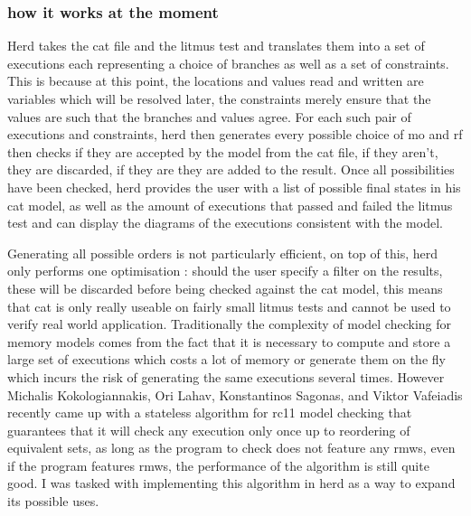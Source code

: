 \documentclass[a4,12pt]{article}
\begin{document}
\subsubsection{how it works at the moment}

Herd takes the cat file and the litmus test and translates them into a set of executions each representing a choice of branches as well as a set of constraints. This is because at this point, the locations and values read and written are variables which will be resolved later, the constraints merely ensure that the values are such that the branches and values agree. For each such pair of executions and constraints, herd then generates every possible choice of mo and rf then checks if they are accepted by the model from the cat file, if they aren't, they are discarded, if they are they are added to the result. Once all possibilities have been checked, herd provides the user with a list of possible final states in his cat model, as well as the amount of executions that passed and failed the litmus test and can display the diagrams of the executions consistent with the model.


Generating all possible orders is not particularly efficient, on top of this, herd only performs one optimisation : should the user specify a filter on the results, these will be discarded before being checked against the cat model, this means that cat is only really useable on fairly small litmus tests and cannot be used to verify real world application. Traditionally the complexity of model checking for memory models comes from the fact that it is necessary to compute and store a large set of executions which costs a lot of memory or generate them on the fly which incurs the risk of generating the same executions several times. However Michalis Kokologiannakis, Ori Lahav, Konstantinos Sagonas, and Viktor Vafeiadis recently came up with a stateless algorithm for rc11 model checking that guarantees that it will check any execution only once up to reordering of equivalent sets, as long as the program to check does not feature any rmws, even if the program features rmws, the performance of the algorithm is still quite good. I was tasked with implementing this algorithm in herd as a way to expand its possible uses.
\end{document}
